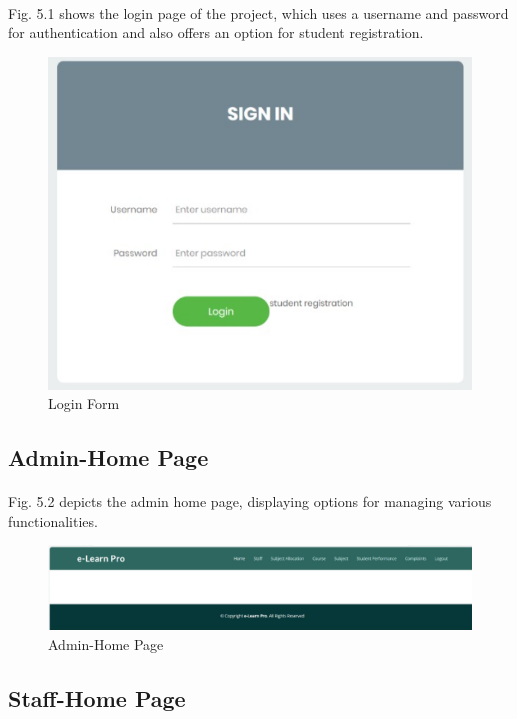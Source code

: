 \paragraph{} Fig. 5.1 shows the login page of the project, which uses a username and password for authentication and also offers an option for student registration.
\begin{figure}[!ht]
\centering
\includegraphics[width=125mm]{login.png}
\caption{Login Form}
\end{figure} 

\subsection{Admin-Home Page}
\paragraph{} Fig. 5.2 depicts the admin home page, displaying options for managing various functionalities.

\begin{figure}[!ht]
\centering
\includegraphics[width=125mm]{Admin homepage.png}
\caption{Admin-Home Page}
\end{figure} 

\subsection{Staff-Home Page}


